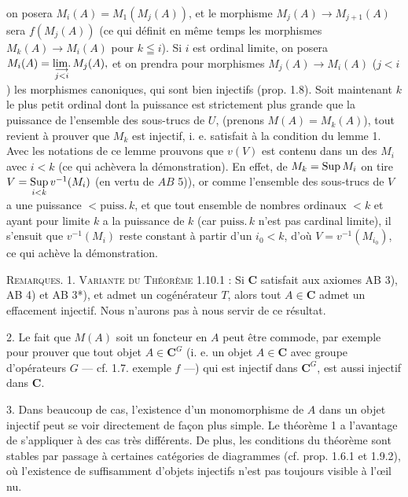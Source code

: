 
\noindent on posera $M_i(A)=M_1(M_j(A))$, et le morphisme
$M_j(A)\to M_{j+1}(A)$ sera $f(M_j(A))$ (ce qui définit en même
temps les morphismes $M_k(A)\to M_i(A)$ pour $k\leqq i$). Si $i$
est ordinal limite, on posera
$M_i(A)=\mathop{\rm lim.}\limits_{\substack{\longrightarrow\\j<i}}M_j(A),$ et on prendra pour morphismes $M_j(A)\to M_i(A)$
($j<i$) les morphismes canoniques, qui sont bien injectifs (prop. 1.8). Soit
maintenant $k$ le plus petit ordinal dont la puissance est strictement plus
grande que la puissance de l'ensemble des sous-trucs de $U$, (prenons
$M(A)=M_k(A)$), tout revient à prouver que $M_k$ est injectif, i. e. satisfait
à la condition du lemme 1. Avec les notations de ce lemme prouvons que $v(V)$
est contenu dans un des $M_i$ avec $i<k$ (ce qui achèvera la démonstration).
En effet, de $M_k=\mathop{\rm Sup}M_i$ on tire
$V=\mathop{\rm Sup}\limits_{i<k}v^{-1}(M_i)$ (en vertu de $AB$ 5)), or comme l'ensemble des sous-trucs de $V$ a une
puissance $<\mathrm{puiss.}\,k$, et que tout ensemble de nombres ordinaux $<k$
et ayant pour limite $k$ a la puissance de $k$ (car $\mathrm{puiss.}\,k$ n'est
pas cardinal limite), il s'ensuit que $v^{-1}(M_i)$ reste constant à partir
d'un $i_0<k$, d'où $V=v^{-1}(M_{i_0})$, ce qui achève la démonstration.

\textsc{Remarques. 1. Variante du Théorème 1.10.1 :} Si $\mathbf{C}$ satisfait
aux axiomes AB 3), AB 4) et AB 3*), et admet un cogénérateur $T$, alors tout
$A\in \mathbf{C}$ admet un effacement injectif. Nous n'aurons pas à nous servir de ce
résultat.

 2. Le fait que $M(A)$ soit un foncteur en $A$ peut être commode, par
exemple pour prouver que tout objet $A\in \mathbf{C}^G$ (i. e. un objet $A\in \mathbf{C}$ avec
groupe d'opérateurs $G$ --- cf. 1.7. exemple $f$ ---) qui est injectif dans
$\mathbf{C}^G$, est aussi injectif dans $\mathbf{C}$.

 3. Dans beaucoup de cas, l'existence d'un monomorphisme de $A$ dans
un objet injectif peut se voir directement de façon plus simple. Le théorème 1
a l'avantage de s'appliquer à des cas très différents. De plus, les conditions
du théorème sont stables par passage à certaines catégories de diagrammes
(cf. prop. 1.6.1 et 1.9.2), où l'existence de suffisamment d'objets injectifs
n'est pas toujours visible à l'œil nu.

